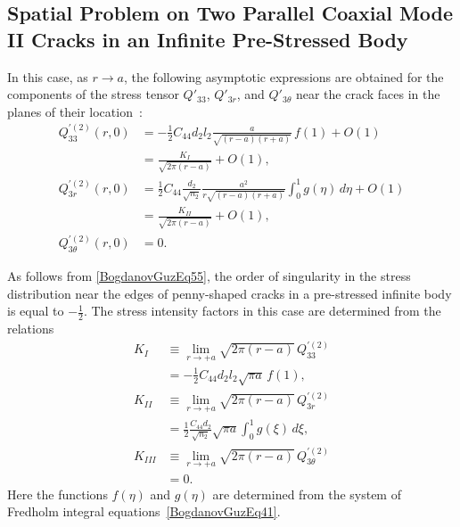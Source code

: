 \subsection{Spatial Problem on Two Parallel Coaxial Mode II Cracks in an Infinite Pre-Stressed Body}

In this case, as $r\to a$, the following asymptotic expressions are obtained
for the components of the stress tensor
$Q'_{33}$, $Q'_{3r}$, and $Q'_{3\theta}$ near the crack faces in the planes of
their location~\cite{BogdanovGuz32}:
\begin{equation}
	\label{BogdanovGuzEq55}
	\begin{aligned}
		Q_{33}^{\prime(2)}(r,0)
		&=
			-\frac{1}{2}C_{44} d_{2} l_{2}
			\frac{a}{\sqrt{(r-a)(r+a)}}\,f(1)
			+O(1)
			\\
			&=
			\frac{K_{I}}{\sqrt{2\pi (r-a)}}+O(1),
		\\
		Q_{3r}^{\prime(2)}(r,0)
		&=
			\frac{1}{2}C_{44}\frac{d_{2}}{\sqrt{n_{2}}}
			\frac{a^{2}}{r\sqrt{(r-a)(r+a)}}
			\int_{0}^{1} g(\eta)\,d\eta
			+O(1)
			\\
			&=
			\frac{K_{II}}{\sqrt{2\pi (r-a)}}+O(1),
			\\
		Q_{3\theta}^{\prime(2)}(r,0)
		&=
		0.
	\end{aligned}
\end{equation}

As follows from \eqref{BogdanovGuzEq55}, the order of singularity in the
stress distribution near the edges of penny-shaped cracks in a pre-stressed
infinite body is equal to $-\frac12$. The stress intensity factors in this case
are determined from the relations
\begin{equation}
	\label{BogdanovGuzEq56}
	\begin{aligned}
		K_{I}
		&\equiv
			\lim_{r\to +a}\sqrt{2\pi(r-a)}\,Q_{33}^{\prime(2)}
			\\
			&=
			-\frac{1}{2}C_{44} d_{2} l_{2}
			\sqrt{\pi a}\,f(1),
		\\
		K_{II}
		&\equiv
		\lim_{r\to +a}\sqrt{2\pi(r-a)}\,Q_{3r}^{\prime(2)}
			\\
			&=
			\frac{1}{2}\frac{C_{44} d_{2}}{\sqrt{n_{2}}}
			\sqrt{\pi a}
			\int_{0}^{1} g(\xi)\,d\xi ,
		\\
		K_{III}
		&\equiv
		\lim_{r\to +a}\sqrt{2\pi(r-a)}\,Q_{3\theta}^{\prime(2)}
		\\
		&=0 .
	\end{aligned}
\end{equation}
%
Here the functions $f(\eta)$ and $g(\eta)$ are determined from the system of
Fredholm integral equations~\eqref{BogdanovGuzEq41}.

